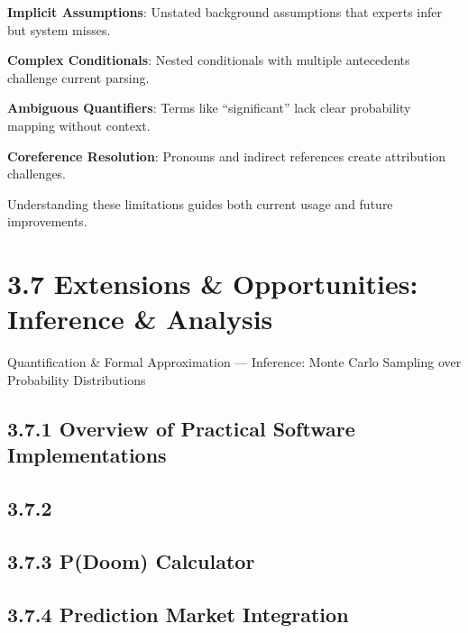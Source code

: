 \documentclass[
  11pt,
  letterpaper,
]{book}
\begin{document}
\textbf{Implicit Assumptions}: Unstated background assumptions that
experts infer but system misses.

\textbf{Complex Conditionals}: Nested conditionals with multiple
antecedents challenge current parsing.

\textbf{Ambiguous Quantifiers}: Terms like ``significant'' lack clear
probability mapping without context.

\textbf{Coreference Resolution}: Pronouns and indirect references create
attribution challenges.

Understanding these limitations guides both current usage and future
improvements.

\section*{3.7 Extensions \& Opportunities: Inference \&
Analysis}\label{extensions-opportunities-inference-analysis}


Quantification \& Formal Approximation --- Inference: Monte Carlo
Sampling over Probability Distributions

\subsection*{3.7.1 Overview of Practical Software
Implementations}\label{overview-of-practical-software-implementations}

\subsection*{3.7.2}\label{section}

\subsection*{3.7.3 P(Doom) Calculator}\label{pdoom-calculator}

\subsection*{3.7.4 Prediction Market
Integration}\label{prediction-market-integration}
\end{document}
